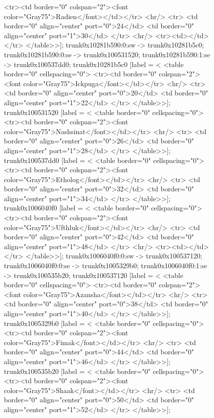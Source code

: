 \documentclass[12pt]{article}
\begin{document}
\begin{figure}
{{	<tr><td border="0" colspan="2"><font color="Gray75">Radien</font></td></tr>
	<hr/>
	<tr>
	<td border="0" align="center" port="0">24</td>
	<td border="0" align="center" port="1">30</td>
	</tr>
	<hr/>
	<tr><td></td></tr>
</table>>];
	trunk0x10281b590:0:sw -> trunk0x10281b5c0;
	trunk0x10281b590:0:se -> trunk0x100531520;
	trunk0x10281b590:1:se -> trunk0x100537dd0;
	trunk0x10281b5c0 [label = <
<table border="0" cellspacing="0">
	<tr><td border="0" colspan="2"><font color="Gray75">Ickpuga</font></td></tr>
	<hr/>
	<tr>
	<td border="0" align="center" port="0">20</td>
	<td border="0" align="center" port="1">22</td>
	</tr>
</table>>];
	trunk0x100531520 [label = <
<table border="0" cellspacing="0">
	<tr><td border="0" colspan="2"><font color="Gray75">Nashsinat</font></td></tr>
	<hr/>
	<tr>
	<td border="0" align="center" port="0">26</td>
	<td border="0" align="center" port="1">28</td>
	</tr>
</table>>];
	trunk0x100537dd0 [label = <
<table border="0" cellspacing="0">
	<tr><td border="0" colspan="2"><font color="Gray75">Etholog</font></td></tr>
	<hr/>
	<tr>
	<td border="0" align="center" port="0">32</td>
	<td border="0" align="center" port="1">34</td>
	</tr>
</table>>];
	trunk0x1006040f0 [label = <
<table border="0" cellspacing="0">
	<tr><td border="0" colspan="2"><font color="Gray75">Ufthluk</font></td></tr>
	<hr/>
	<tr>
	<td border="0" align="center" port="0">42</td>
	<td border="0" align="center" port="1">48</td>
	</tr>
	<hr/>
	<tr><td></td></tr>
</table>>];
	trunk0x1006040f0:0:sw -> trunk0x100537120;
	trunk0x1006040f0:0:se -> trunk0x1005329b0;
	trunk0x1006040f0:1:se -> trunk0x100535b20;
	trunk0x100537120 [label = <
<table border="0" cellspacing="0">
	<tr><td border="0" colspan="2"><font color="Gray75">Azansha</font></td></tr>
	<hr/>
	<tr>
	<td border="0" align="center" port="0">38</td>
	<td border="0" align="center" port="1">40</td>
	</tr>
</table>>];
	trunk0x1005329b0 [label = <
<table border="0" cellspacing="0">
	<tr><td border="0" colspan="2"><font color="Gray75">Fimak</font></td></tr>
	<hr/>
	<tr>
	<td border="0" align="center" port="0">44</td>
	<td border="0" align="center" port="1">46</td>
	</tr>
</table>>];
	trunk0x100535b20 [label = <
<table border="0" cellspacing="0">
	<tr><td border="0" colspan="2"><font color="Gray75">Shaak</font></td></tr>
	<hr/>
	<tr>
	<td border="0" align="center" port="0">50</td>
	<td border="0" align="center" port="1">52</td>
	</tr>
</table>>];
		}
	}
\end{figure}
\end{document}
